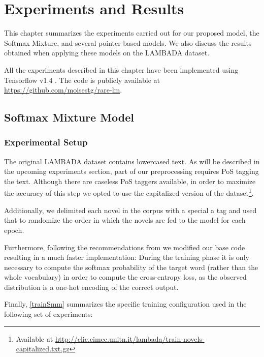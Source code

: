 \chapter{Experiments and Results}
\label{chapter:experiments}

This chapter summarizes the experiments carried out for our proposed model, the Softmax Mixture, and several pointer based models. We also discuss the results obtained when applying these models on the LAMBADA dataset.

All the experiments described in this chapter have been implemented using Tensorflow v1.4 \cite{tensorflow2015}. The code is publicly available at \url{https://github.com/moisestg/rare-lm}.

\section{Softmax Mixture Model}
\label{sec:smmExps}

\subsection{Experimental Setup}

The original LAMBADA dataset contains lowercased text. As will be described in the upcoming experiments section, part of our preprocessing requires PoS tagging the text. Although there are caseless PoS taggers available, in order to maximize the accuracy of this step we opted to use the capitalized version of the dataset\footnote{Available at \url{http://clic.cimec.unitn.it/lambada/train-novels-capitalized.txt.gz}}.

Additionally, we delimited each novel in the corpus with a special a tag and used that to randomize the order in which the novels are fed to the model for each epoch.

Furthermore, following the recommendations from \cite{merity2016pointer} we modified our base code resulting in a much faster implementation: During the training phase it is only necessary to compute the softmax probability of the target word (rather than the whole vocabulary) in order to compute the cross-entropy loss, as the observed distribution is a one-hot encoding of the correct output.

Finally, \autoref{trainSmm} summarizes the specific training configuration used in the following set of experiments:


